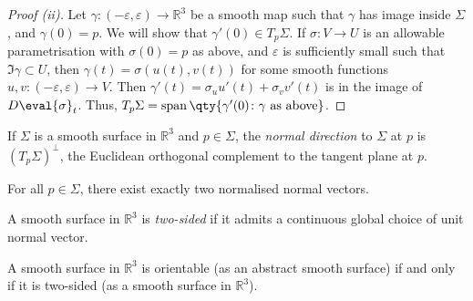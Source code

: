 \begin{proof}[Proof (ii)]
	Let $\gamma \colon (-\varepsilon, \varepsilon) \to \mathbb R^3$ be a smooth map such that $\gamma$ has image inside $\Sigma$, and $\gamma(0) = p$.
	We will show that $\gamma'(0) \in T_p \Sigma$.
	If $\sigma \colon V \to U$ is an allowable parametrisation with $\sigma(0) = p$ as above, and $\varepsilon$ is sufficiently small such that $\Im \gamma \subset U$, then $\gamma(t) = \sigma(u(t), v(t))$ for some smooth functions $u, v \colon (-\varepsilon, \varepsilon) \to V$.
	Then $\gamma'(t) = \sigma_u u'(t) + \sigma_v v'(t)$ is in the image of $D \eval{\sigma}_t$.
	Thus, $T_p \Sigma = \vecspan \qty{ \gamma'(0) \colon \gamma \text{ as above} }$.
\end{proof}
\begin{definition}
	If $\Sigma$ is a smooth surface in $\mathbb R^3$ and $p \in \Sigma$, the \textit{normal direction} to $\Sigma$ at $p$ is $(T_p \Sigma)^\perp$, the Euclidean orthogonal complement to the tangent plane at $p$.
\end{definition}
\begin{remark}
	For all $p \in \Sigma$, there exist exactly two normalised normal vectors.
\end{remark}
\begin{definition}
	A smooth surface in $\mathbb R^3$ is \textit{two-sided} if it admits a continuous global choice of unit normal vector.
\end{definition}
\begin{lemma}
	A smooth surface in $\mathbb R^3$ is orientable (as an abstract smooth surface) if and only if it is two-sided (as a smooth surface in $\mathbb R^3$).
\end{lemma}
